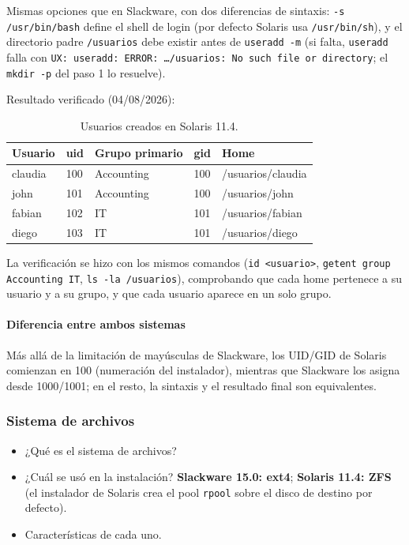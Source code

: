 \documentclass[11pt,a4paper]{report}
\begin{document}
Mismas opciones que en Slackware, con dos diferencias de sintaxis: \texttt{-s /usr/bin/bash} define el shell de login (por defecto Solaris usa \texttt{/usr/bin/sh}), y el directorio padre \texttt{/usuarios} debe existir antes de \texttt{useradd -m} (si falta, \texttt{useradd} falla con \texttt{UX: useradd: ERROR: \ldots /usuarios: No such file or directory}; el \texttt{mkdir -p} del paso 1 lo resuelve).

Resultado verificado (04/08/2026):

\begin{table}[H]
  \centering
  \begin{tabular}{@{}lllll@{}}
    \toprule
    \textbf{Usuario} & \textbf{uid} & \textbf{Grupo primario} & \textbf{gid} & \textbf{Home} \\
    \midrule
    claudia & 100 & Accounting & 100 & /usuarios/claudia \\
    john    & 101 & Accounting & 100 & /usuarios/john \\
    fabian  & 102 & IT         & 101 & /usuarios/fabian \\
    diego   & 103 & IT         & 101 & /usuarios/diego \\
    \bottomrule
  \end{tabular}
  \caption{Usuarios creados en Solaris 11.4.}
  \label{tab:sol-users}
\end{table}

La verificación se hizo con los mismos comandos (\texttt{id <usuario>}, \texttt{getent group Accounting IT}, \texttt{ls -la /usuarios}), comprobando que cada home pertenece a su usuario y a su grupo, y que cada usuario aparece en un solo grupo.

\paragraph*{Diferencia entre ambos sistemas}

Más allá de la limitación de mayúsculas de Slackware, los UID/GID de Solaris comienzan en 100 (numeración del instalador), mientras que Slackware los asigna desde 1000/1001; en el resto, la sintaxis y el resultado final son equivalentes.

\subsubsection{Sistema de archivos}

\begin{itemize}
  \item ¿Qué es el sistema de archivos?
  \item ¿Cuál se usó en la instalación? \textbf{Slackware 15.0: ext4}; \textbf{Solaris 11.4: ZFS} (el instalador de Solaris crea el pool \texttt{rpool} sobre el disco de destino por defecto).
  \item Características de cada uno.
\end{itemize}
\end{document}
